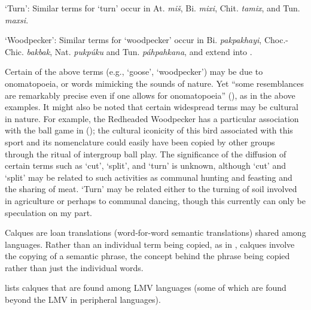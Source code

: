 \documentclass[output=paper]{LSP/langsci}
\begin{document}
\ea  \parbox[t]{.9\textwidth}{`Turn': Similar terms for `turn' occur in At. \emph{miš}, Bi. \emph{mixi}, Chit. \emph{tamix}, and Tun. \emph{maxsi}.}
\z

\ea  \parbox[t]{.9\textwidth}{`Woodpecker': Similar terms for `woodpecker' occur in Bi. \emph{pakpakhayi}, Choc.-Chic. \emph{bakbak}, Nat. \emph{pukpúku} and Tun. \emph{páhpahkana}, and extend into .}
\z

Certain of the above terms (e.g., `goose', `woodpecker') may be due to ono\-ma\-to\-poeia, or words mimicking the sounds of nature. Yet “some resemblances are remarkably precise even if one allows for onomatopoeia” (\citealt[82]{Haas1969}), as in the above examples. It might also be noted that certain widespread terms may be cultural in nature. For example, the Redheaded Woodpecker has a particular association with the ball game in  (\citealt[34--37]{Galvan2011}); the cultural iconicity of this bird associated with this sport and its nomenclature could easily have been copied by other groups through the ritual of intergroup ball play. The significance of the diffusion of certain terms such as `cut', `split', and `turn' is unknown, although `cut' and `split' may be related to such activities as communal hunting and feasting and the sharing of meat. `Turn' may be related either to the turning of soil involved in agriculture or perhaps to communal dancing, though this currently can only be speculation on my part. 

Calques are loan translations (word-for-word semantic translations) shared among languages. Rather than an individual term being copied, as in , calques involve the copying of a semantic phrase, the concept behind the phrase being copied rather than just the individual words.

 lists calques that are found among LMV languages (some of which are found beyond the LMV in peripheral languages). 
\end{document}
